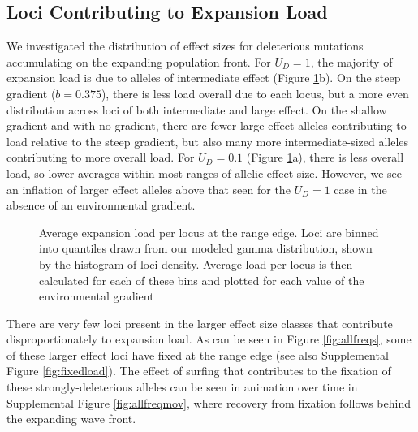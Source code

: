 \subsection{Loci Contributing to Expansion Load}
We investigated the distribution of effect sizes for deleterious mutations accumulating on the expanding population front. For $U_D = 1$, the majority of expansion load is due to alleles of intermediate effect (Figure \ref{fig:loci}b). On the steep gradient ($b = 0.375$), there is less load overall due to each locus, but a more even distribution across loci of both intermediate and large effect. On the shallow gradient and with no gradient, there are fewer large-effect alleles contributing to load relative to the steep gradient, but also many more intermediate-sized alleles contributing to more overall load. For $U_D = 0.1$ (Figure \ref{fig:loci}a), there is less overall load, so lower averages within most ranges of allelic effect size. However, we see an inflation of larger effect alleles above that seen for the $U_D= 1$ case in the absence of an environmental gradient.

\begin{figure}[H]
\centering
{}
\caption[Average expansion load per locus.]{Average expansion load per locus at the range edge. Loci are binned into quantiles drawn from our modeled gamma distribution, shown by the histogram of loci density. Average load per locus is then calculated for each of these bins and plotted for each value of the environmental gradient}
\label{fig:loci}
\end{figure}

There are very few loci present in the larger effect size classes that contribute disproportionately to expansion load. As can be seen in Figure \ref{fig:allfreqs}, some of these larger effect loci have fixed at the range edge (see also Supplemental Figure \ref{fig:fixedload}). The effect of surfing that contributes to the fixation of these strongly-deleterious alleles can be seen in animation over time in Supplemental Figure \ref{fig:allfreqmov}, where recovery from fixation follows behind the expanding wave front.


